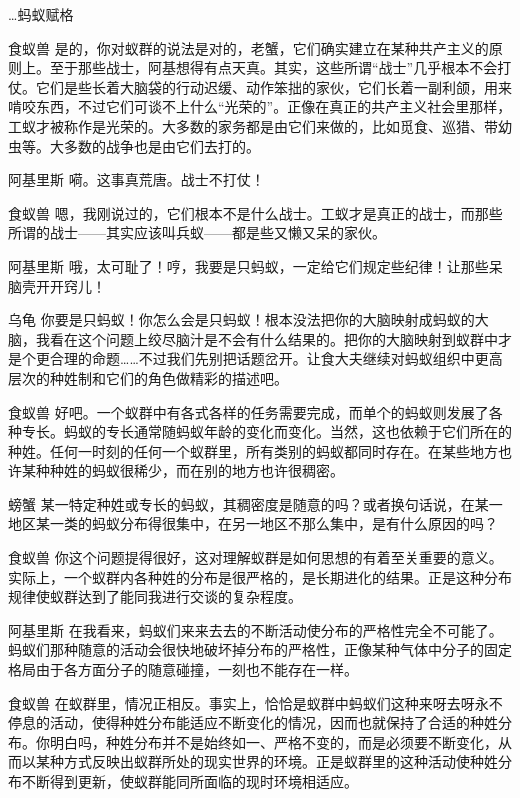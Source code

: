 \begin{dialog}{…蚂蚁赋格}
\begin{dialogue}
\item[食蚁兽]是的，你对蚁群的说法是对的，老蟹，它们确实建立在某种共产主义的原则上。至于那些战士，阿基想得有点天真。其实，这些所谓“战士”几乎根本不会打仗。它们是些长着大脑袋的行动迟缓、动作笨拙的家伙，它们长着一副利颌，用来啃咬东西，不过它们可谈不上什么“光荣的”。正像在真正的共产主义社会里那样，工蚁才被称作是光荣的。大多数的家务都是由它们来做的，比如觅食、巡猎、带幼虫等。大多数的战争也是由它们去打的。

\item[阿基里斯]嗬。这事真荒唐。战士不打仗！

\item[食蚁兽]嗯，我刚说过的，它们根本不是什么战士。工蚁才是真正的战士，而那些所谓的战士——其实应该叫兵蚁——都是些又懒又呆的家伙。

\item[阿基里斯]哦，太可耻了！哼，我要是只蚂蚁，一定给它们规定些纪律！让那些呆脑壳开开窍儿！

\item[乌龟]你要是只蚂蚁！你怎么会是只蚂蚁！根本没法把你的大脑映射成蚂蚁的大脑，我看在这个问题上绞尽脑汁是不会有什么结果的。把你的大脑映射到蚁群中才是个更合理的命题……不过我们先别把话题岔开。让食大夫继续对蚂蚁组织中更高层次的种姓制和它们的角色做精彩的描述吧。

\item[食蚁兽]好吧。一个蚁群中有各式各样的任务需要完成，而单个的蚂蚁则发展了各种专长。蚂蚁的专长通常随蚂蚁年龄的变化而变化。当然，这也依赖于它们所在的种姓。任何一时刻的任何一个蚁群里，所有类别的蚂蚁都同时存在。在某些地方也许某种种姓的蚂蚁很稀少，而在别的地方也许很稠密。

\item[螃蟹]某一特定种姓或专长的蚂蚁，其稠密度是随意的吗？或者换句话说，在某一地区某一类的蚂蚁分布得很集中，在另一地区不那么集中，是有什么原因的吗？

\item[食蚁兽]你这个问题提得很好，这对理解蚁群是如何思想的有着至关重要的意义。实际上，一个蚁群内各种姓的分布是很严格的，是长期进化的结果。正是这种分布规律使蚁群达到了能同我进行交谈的复杂程度。

\item[阿基里斯]在我看来，蚂蚁们来来去去的不断活动使分布的严格性完全不可能了。蚂蚁们那种随意的活动会很快地破坏掉分布的严格性，正像某种气体中分子的固定格局由于各方面分子的随意碰撞，一刻也不能存在一样。

\item[食蚁兽]在蚁群里，情况正相反。事实上，恰恰是蚁群中蚂蚁们这种来呀去呀永不停息的活动，使得种姓分布能适应不断变化的情况，因而也就保持了合适的种姓分布。你明白吗，种姓分布并不是始终如一、严格不变的，而是必须要不断变化，从而以某种方式反映出蚁群所处的现实世界的环境。正是蚁群里的这种活动使种姓分布不断得到更新，使蚁群能同所面临的现时环境相适应。


\end{dialogue}
\end{dialog}
